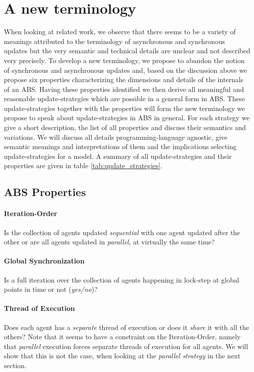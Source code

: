 \section{A new terminology}
When looking at related work, we observe that there seems to be a variety of meanings attributed to the terminology of asynchronous and synchronous updates but the very semantic and technical details are unclear and not described very precisely. To develop a new terminology, we propose to abandon the notion of synchronous and asynchronous updates and, based on the discussion above we propose six properties characterizing the dimensions and details of the internals of an ABS. Having these properties identified we then derive all meaningful and reasonable update-strategies which are possible in a general form in ABS. These update-strategies together with the properties will form the new terminology we propose to speak about update-strategies in ABS in general. For each strategy we give a short description, the list of all properties and discuss their semantics and variations. We will discuss all details programming-language agnostic, give semantic meanings and interpretations of them and the implications selecting update-strategies for a model. A summary of all update-strategies and their properties are given in table \ref{tab:update_strategies}.

\subsection{ABS Properties}

\paragraph{Iteration-Order}
Is the collection of agents updated \textit{sequential} with one agent updated after the other or are all agents updated in \textit{parallel}, at virtually the same time?

\paragraph{Global Synchronization}
Is a full iteration over the collection of agents happening in lock-step at global points in time or not (\textit{yes/no})?

\paragraph{Thread of Execution}
Does each agent has a \textit{separate} thread of execution or does it \textit{share} it with all the others? Note that it seems to have a constraint on the Iteration-Order, namely that \textit{parallel} execution forces separate threads of execution for all agents. We will show that this is not the case, when looking at the \textit{parallel strategy} in the next section.

